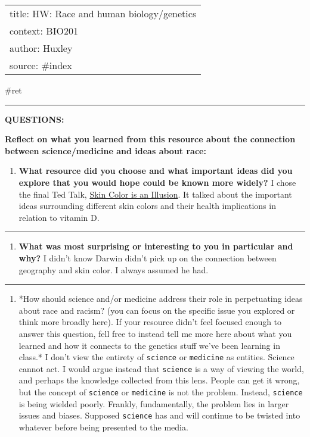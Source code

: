 \documentclass[letterpaper]{article}
\date{\today}
\title{}
\begin{document}
\begin{center}
\begin{tabular}{l}
title: HW: Race and human biology/genetics\\
context: BIO201\\
author: Huxley\\
source: \#index\\
\end{tabular}
\end{center}

\#ret

\noindent\rule{\textwidth}{0.5pt}

\textbf{QUESTIONS:}

\textbf{Reflect on what you learned from this resource about the connection
between science/medicine and ideas about race:}

\begin{enumerate}
\item \textbf{What resource did you choose and what important ideas did you
explore that you would hope could be known more widely?} I chose the
final Ted Talk, \href{https://www.youtube.com/watch?v=QOSPNVunyFQ}{Skin
Color is an Illusion}. It talked about the important ideas
surrounding different skin colors and their health implications in
relation to vitamin D.
\end{enumerate}

\noindent\rule{\textwidth}{0.5pt}

\begin{enumerate}
\item \textbf{What was most surprising or interesting to you in particular and
why?} I didn't know Darwin didn't pick up on the connection between
geography and skin color. I always assumed he had.
\end{enumerate}

\noindent\rule{\textwidth}{0.5pt}

\begin{enumerate}
\item *How should science and/or medicine address their role in
perpetuating ideas about race and racism? (you can focus on the
specific issue you explored or think more broadly here). If your
resource didn't feel focused enough to answer this question, fell
free to instead tell me more here about what you learned and how it
connects to the genetics stuff we've been learning in class.* I don't
view the entirety of \texttt{science} or \texttt{medicine} as entities. Science
cannot act. I would argue instead that \texttt{science} is a way of viewing
the world, and perhaps the knowledge collected from this lens. People
can get it wrong, but the concept of \texttt{science} or \texttt{medicine} is not
the problem. Instead, \texttt{science} is being wielded poorly. Frankly,
fundamentally, the problem lies in larger issues and biases. Supposed
\texttt{science} has and will continue to be twisted into whatever before
being presented to the media.
\end{enumerate}
\end{document}
